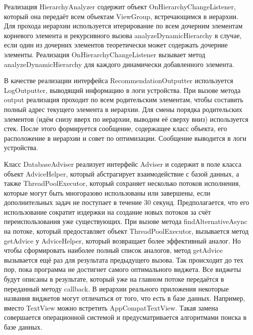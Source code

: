 \documentclass[a4paper,14pt]{extarticle} %
\begin{document}
	Реализация HierarchyAnalyzer содержит объект OnHierarchyChangeListener, который она передаёт всем объектам ViewGroup, встречающимся в иерархии. Для прохода иерархии используется итерирование по всем дочерним элементам корневого элемента и рекурсивного вызова analyzeDynamicHierarchy в случае, если один из дочерних элементов теоретически может содержать дочерние элементы. Реализация OnHierarchyChangeListener вызывает метод analyzeDynamicHierarchy для каждого динамически добавленного элемента.
	
	В качестве реализации интерфейса RecommendationOutputter используется LogOutputter, выводящий информацию в логи устройства. При вызове метода output реализация проходит по всем родительским элементам, чтобы составить полный адрес текущего элемента в иерархии. Для смены порядка родительских элементов (идём снизу вверх по иерархии, выводим её сверху вниз) используется стек. После этого формируется сообщение, содержащее класс объекта, его расположение в иерархии и совет по оптимизации. Сообщение выводится в логи устройства.
	
	Класс DatabaseAdviser реализует интерфейс Adviser и содержит в поле класса объект AdviceHelper, который абстрагирует взаимодействие с базой данных, а также ThreadPoolExecutor, который сохраняет несколько потоков исполнения, которые могут быть многоразово использованы или завершены, если дополнительных задач не поступает в течение 30 секунд. Предполагается, что его использование сократит издержки на создание новых потоков за счёт переиспользования уже существующих. При вызове метода findAlternativeAsync на потоке, который предоставляет объект ThreadPoolExecutor, вызывается метод getAdvice у AdviceHelper, который возвращает более эффективный аналог. Но чтобы сформировать наиболее полный список аналогов, метод getAdvice вызывается ещё раз для результата предыдущего вызова. Так происходит до тех пор, пока программа не достигнет самого оптимального виджета. Все виджеты будут описаны в результате, который уже на главном потоке передаётся в переданный методу callback. В иерархии реального приложения некоторые названия виджетов могут отличаться от того, что есть в базе данных. Например, вместо TextView можно встретить AppCompatTextView. Такая замена совершается операционной системой и предусматривается алгоритмами поиска в базе данных.
	
\end{document}
